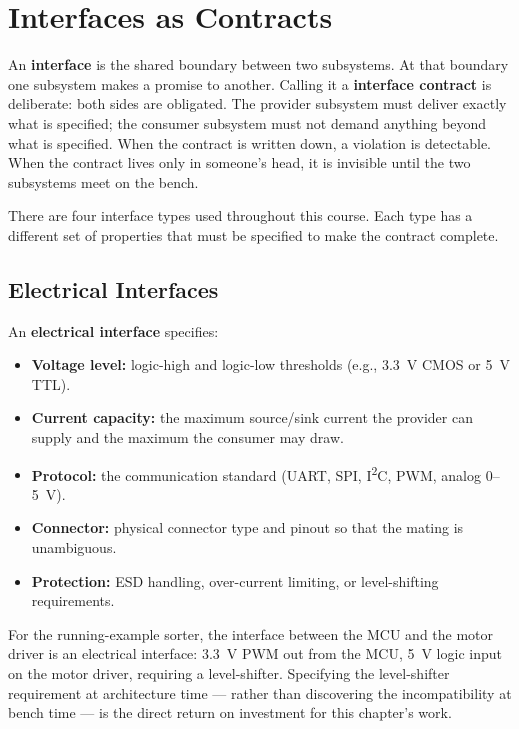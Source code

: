 \section{Interfaces as Contracts}
\label{sec:ch5-interfaces}

An \textbf{interface} is the shared boundary between two subsystems.
At that boundary one subsystem makes a promise to another.
Calling it a \textbf{interface contract} is deliberate: both sides are obligated.
The provider subsystem must deliver exactly what is specified; the consumer subsystem must not demand anything beyond what is specified.
When the contract is written down, a violation is detectable.
When the contract lives only in someone's head, it is invisible until the two subsystems meet on the bench.

There are four interface types used throughout this course.
Each type has a different set of properties that must be specified to make the contract complete.

\subsection{Electrical Interfaces}
\label{subsec:ch5-elec-interface}

An \textbf{electrical interface} specifies:
\begin{itemize}
  \item \textbf{Voltage level:} logic-high and logic-low thresholds (e.g., 3.3~V CMOS or 5~V TTL).
  \item \textbf{Current capacity:} the maximum source/sink current the provider can supply and the maximum the consumer may draw.
  \item \textbf{Protocol:} the communication standard (UART, SPI, I\textsuperscript{2}C, PWM, analog 0--5~V).
  \item \textbf{Connector:} physical connector type and pinout so that the mating is unambiguous.
  \item \textbf{Protection:} ESD handling, over-current limiting, or level-shifting requirements.
\end{itemize}

For the running-example sorter, the interface between the MCU and the motor driver is an electrical interface: 3.3~V PWM out from the MCU, 5~V logic input on the motor driver, requiring a level-shifter.
Specifying the level-shifter requirement at architecture time --- rather than discovering the incompatibility at bench time --- is the direct return on investment for this chapter's work.

